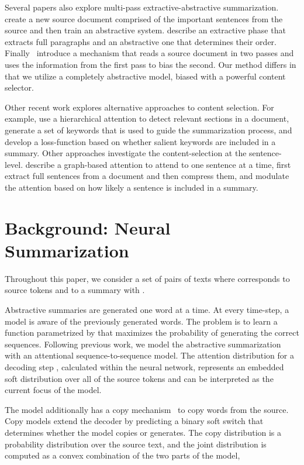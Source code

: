 \documentclass[11pt,a4paper]{article}
\begin{document}
Several papers also explore multi-pass extractive-abstractive summarization.
\citet{nallapati2017summarunner} create a new source document
comprised of the important sentences from the source and then train an
abstractive system. \citet{liu2018generating} describe an extractive
phase that extracts full paragraphs and an abstractive one that
determines their order.  Finally~\citet{zeng2016efficient} introduce a
mechanism that reads a source document in two passes and uses the
information from the first pass to bias the second. Our method differs in that we utilize a completely abstractive model, biased with a powerful
content selector.

Other recent work explores alternative approaches to content selection. For example, \citet{cohan2018discourse} use a hierarchical attention to detect relevant sections in a document, \citet{li2018guiding} generate a set of keywords that is used to guide the summarization process, and \citet{pasunuru2018multi} develop a loss-function based on whether salient keywords are included in a summary. Other approaches investigate the content-selection at the sentence-level. \citet{tan2017abstractive} describe a graph-based attention to attend to one sentence at a time, \citet{chen2018fast} first extract full sentences from a document and then compress them, and \citet{hsu2018unified} modulate the attention based on how likely a sentence is included in a summary.
 
\section{Background: Neural Summarization}

Throughout this paper, we consider a set of pairs of texts  where  corresponds to source tokens  and  to a summary  with . 

 Abstractive summaries are generated one word at a time. At every time-step, a model is aware of the previously generated words. The problem is to learn a function  parametrized by  that maximizes the probability of generating the correct sequences.
Following previous work, we model the abstractive summarization with an attentional sequence-to-sequence model. The attention distribution  for a decoding step , calculated within the neural network, represents an embedded soft distribution over all of the source tokens and can be interpreted as the current focus of the model. 



The model additionally has a copy mechanism~\citep{vinyals2015pointer} to copy words from the source. Copy models extend the decoder by predicting a binary soft switch  that determines whether the model copies or generates. The copy distribution is a probability distribution over the source text, and the joint distribution is computed as a convex combination of the two parts of the model,
\end{document}
